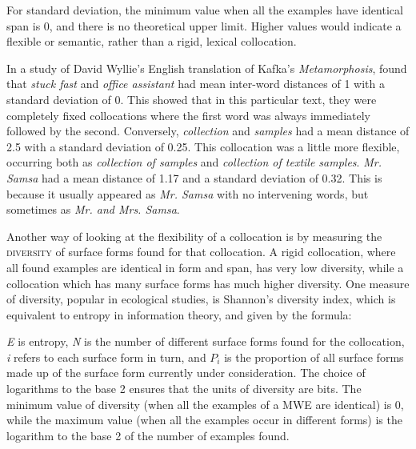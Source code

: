 \documentclass[output=paper]{langsci/langscibook}
\begin{document}
For standard deviation, the minimum value when all the examples have
identical span is 0, and there is no theoretical upper limit. Higher
values would indicate a flexible or semantic, rather than a rigid,
lexical collocation.



In a study of David Wyllie’s English translation of Kafka’s
\textit{Metamorphosis}, \cite{oakes2012} found that \textit{stuck fast} and \textit{office
assistant} had mean inter-word distances of 1 with a standard deviation
of 0. This showed that in this particular text, they were completely
fixed collocations where the first word was always immediately followed
by the second. Conversely, \textit{collection} and \textit{samples} had a mean
distance of 2.5 with a standard deviation of 0.25. This collocation was
a little more flexible, occurring both as \textit{collection of samples} and
\textit{collection of textile samples}. \textit{Mr. Samsa} had a mean distance of
1.17 and a standard deviation of 0.32. This is because it usually
appeared as \textit{Mr. Samsa} with no intervening words, but sometimes as
\textit{Mr. and Mrs. Samsa}. 



Another way of looking at the flexibility of a collocation is by
measuring the  \textsc{diversity} of surface forms found for
that collocation. A rigid collocation, where all found examples are
identical in form and span, has very low diversity, while a collocation
which has many surface forms has much higher diversity. One measure of
diversity, popular in ecological studies, is Shannon’s diversity index,
which is equivalent to entropy  in information theory, and given by the
formula:







\textit{E} is entropy, \textit{N} is
the number of different surface forms found for the collocation,
\textit{i} refers to each surface form in turn,
and $P_i$ is the proportion of all surface
forms made up of the surface form currently under consideration. The
choice of logarithms to the base 2 ensures that the units of diversity
are bits. The minimum value of diversity (when all the examples of a
MWE are identical) is 0, while the maximum value (when all the examples
occur in different forms) is the logarithm to the base 2 of the number
of examples found.
\end{document}
